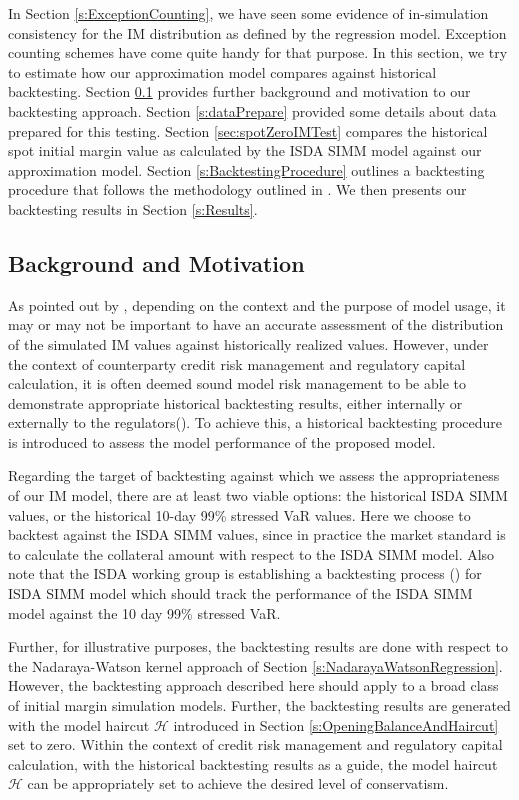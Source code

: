 \documentclass[preprint,12pt]{elsarticle}
\begin{document}
In Section \ref{s:ExceptionCounting}, we have seen some evidence of in-simulation consistency for the IM distribution as defined by the regression model. Exception counting schemes have come quite handy for that purpose. In this section, we try to estimate how our approximation model compares against historical backtesting. Section \ref{s:backtestingBackground} provides further background and motivation to our backtesting approach. Section \ref{s:dataPrepare} provided some details about data prepared for this testing. Section \ref{sec:spotZeroIMTest} compares the historical spot initial margin value as calculated by the ISDA SIMM model against our approximation model. Section \ref{s:BacktestingProcedure} outlines a backtesting procedure that follows the methodology outlined in \cite{ruiz2014backtesting}. We then presents our backtesting results in Section \ref{s:Results}.

\subsection{Background and Motivation}\label{s:backtestingBackground}

As pointed out by \cite{anfuso2016sound}, depending on the context and the purpose of model usage,  it may or may not be important to have an accurate assessment of the distribution of the simulated IM values against historically realized values. However, under the context of counterparty credit risk management and regulatory capital calculation, it is often deemed sound model risk management to be able to demonstrate appropriate historical backtesting results, either internally or externally to the regulators(\citep{Basel2010Backtesting}). To achieve this, a historical backtesting procedure is introduced to assess the model performance of the proposed model.

Regarding the target of backtesting against which we assess the appropriateness of our IM model, there are at least two viable options: the historical ISDA SIMM values, or the historical 10-day 99\% stressed VaR values. Here we choose to backtest against the ISDA SIMM values, since in practice the market standard is to calculate the collateral amount with respect to the ISDA SIMM model. Also note that the ISDA working group is establishing a backtesting process (\cite{isda_simm_2016}) for ISDA SIMM model which should track the performance of the ISDA SIMM model against the 10 day 99\% stressed VaR.

Further, for illustrative purposes, the backtesting results are done with respect to the Nadaraya-Watson kernel approach of Section \ref{s:NadarayaWatsonRegression}. However, the backtesting approach described here should apply to a broad class of initial margin simulation models. Further, the backtesting results are generated with the model haircut $\mathcal{H}$ introduced in Section \ref{s:OpeningBalanceAndHaircut} set to zero. Within the context of credit risk management and regulatory capital calculation, with the historical backtesting results as a guide, the model haircut $\mathcal{H}$ can be appropriately set to achieve the desired level of conservatism.
\end{document}
